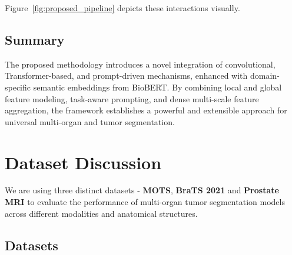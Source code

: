 \documentclass{cls/iutbscthesis}
\begin{document}
Figure~\ref{fig:proposed_pipeline} depicts these interactions visually.

\section{Summary}

The proposed methodology introduces a novel integration of convolutional, Transformer-based, and prompt-driven mechanisms, enhanced with domain-specific semantic embeddings from BioBERT. By combining local and global feature modeling, task-aware prompting, and dense multi-scale feature aggregation, the framework establishes a powerful and extensible approach for universal multi-organ and tumor segmentation.


\chapter{Dataset Discussion}
We are using three distinct datasets - \textbf{MOTS}\cite{zhang2021dodnet}, \textbf{BraTS 2021}\cite{baid2021brats} and \textbf{Prostate MRI}\cite{liu2021feddg} to evaluate the performance of multi-organ tumor segmentation models across different modalities and anatomical structures.

\section{Datasets}

\end{document}
